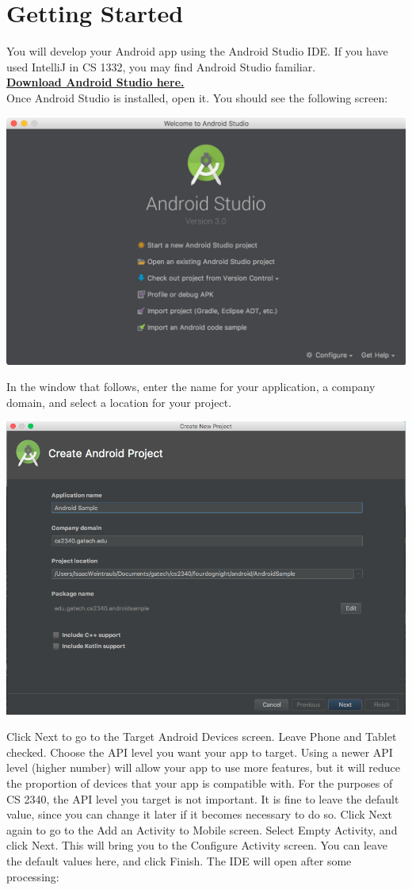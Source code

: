\documentclass{article}
\begin{document}
\section{Getting Started}
You will develop your Android app using the Android Studio IDE. If you have used IntelliJ in CS 1332, you may find Android Studio familiar.\\[0.2cm]
\href{https://developer.android.com/studio/}{\textbf{Download Android Studio here.}}\\[0.2cm]
Once Android Studio is installed, open it. You should see the following screen:
\begin{center}\includegraphics[width=.5\textwidth]{images/studio-open.png}\end{center}
In the window that follows, enter the name for your application, a company domain, and select a location for your project.
\begin{center}\includegraphics[width=.5\textwidth]{images/create-new.png}\end{center}
Click Next to go to the Target Android Devices screen. Leave Phone and Tablet checked. Choose the API level you want your app to target. Using a newer API level (higher number) will allow your app to use more features, but it will reduce the proportion of devices that your app is compatible with. For the purposes of CS 2340, the API level you target is not important. It is fine to leave the default value, since you can change it later if it becomes necessary to do so. Click Next again to go to the Add an Activity to Mobile screen. Select Empty Activity, and click Next. This will bring you to the Configure Activity screen. You can leave the default values here, and click Finish. The IDE will open after some processing:
\end{document}
